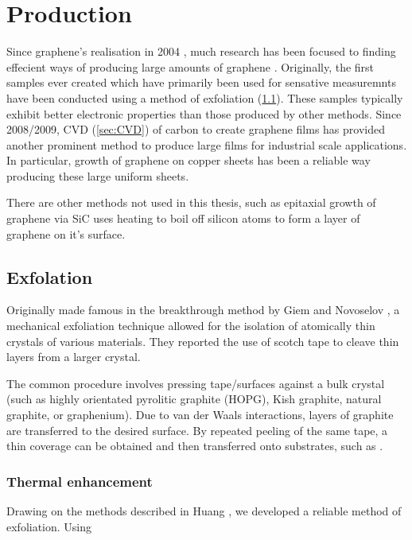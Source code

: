 \documentclass[../Matt_Gebert_Honours_Thesis.tex]{subfiles}
\begin{document}

\section{Production}
Since graphene's realisation in 2004 \cite{novoselov_electric_2004}, much research has been focused to finding effecient ways of producing large amounts of graphene \cite{zhang_review_2013}. Originally, the first samples ever created which have primarily been used for sensative measuremnts have been conducted using a method of exfoliation (\cref{sec:exfoliation}). These samples typically exhibit better electronic properties than those produced by other methods.
Since 2008/2009, CVD (\cref{sec:CVD}) of carbon to create graphene films has provided another prominent method to produce large films for industrial scale applications. In particular, growth of graphene on copper sheets \cite{li_large-area_2009} has been a reliable way producing these large uniform sheets.

There are other methods not used in this thesis, such as epitaxial growth of graphene via SiC uses heating to boil off silicon atoms to form a layer of graphene on it's surface.

\subsection{Exfolation}\label{sec:exfoliation}
Originally made famous in the breakthrough method by Giem and Novoselov \cite{novoselov_electric_2004, novoselov_two-dimensional_2005}, a mechanical exfoliation technique allowed for the isolation of atomically thin crystals of various materials. They reported the use of scotch tape to cleave thin layers from a larger crystal. 

The common procedure involves pressing tape/surfaces against a bulk crystal (such as highly orientated pyrolitic graphite (HOPG), Kish graphite, natural graphite, or graphenium). Due to van der Waals interactions, layers of graphite are transferred to the desired surface. By repeated peeling of the same tape, a thin coverage can be obtained and then transferred onto substrates, such as \silicondioxide.

\subsubsection{Thermal enhancement}
Drawing on the methods described in Huang \etal\cite{huang_reliable_2015}, we developed a reliable method of exfoliation. 
Using 
\end{document}
